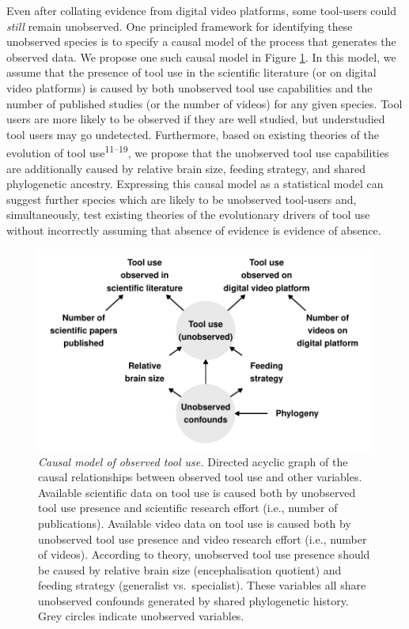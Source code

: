 \documentclass[
  man, donotrepeattitle,floatsintext]{apa6}
\begin{document}
Even after collating evidence from digital video platforms, some tool-users
could \emph{still} remain unobserved. One principled framework for identifying these
unobserved species is to specify a causal model of the process that generates
the observed data. We propose one such causal model in Figure
\ref{fig:plotDAG}. In this model, we assume that the presence of tool use in
the scientific literature (or on digital video platforms) is caused by both
unobserved tool use capabilities and the number of published studies (or the
number of videos) for any given species. Tool users are more likely to be
observed if they are well studied, but understudied tool users may go
undetected. Furthermore, based on existing theories of the evolution of tool use\textsuperscript{11--19}, we propose
that the unobserved tool use capabilities are additionally caused by relative
brain size, feeding strategy, and shared phylogenetic ancestry. Expressing this
causal model as a statistical model can suggest further species which are likely
to be unobserved tool-users and, simultaneously, test existing theories of the
evolutionary drivers of tool use without incorrectly assuming that absence of
evidence is evidence of absence.












\begin{figure}
\centering
\includegraphics{manuscript_files/figure-latex/plotDAG-1.pdf}
\caption{\label{fig:plotDAG}\emph{Causal model of observed tool use.} Directed acyclic graph
of the causal relationships between observed tool use and other variables.
Available scientific data on tool use is caused both by unobserved tool use
presence and scientific research effort (i.e., number of publications).
Available video data on tool use is caused both by unobserved tool use
presence and video research effort (i.e., number of videos). According to
theory, unobserved tool use presence should be caused by relative brain size
(encephalisation quotient) and feeding strategy (generalist vs.~specialist).
These variables all share unobserved confounds generated by shared phylogenetic
history. Grey circles indicate unobserved variables.}
\end{figure}
\end{document}
